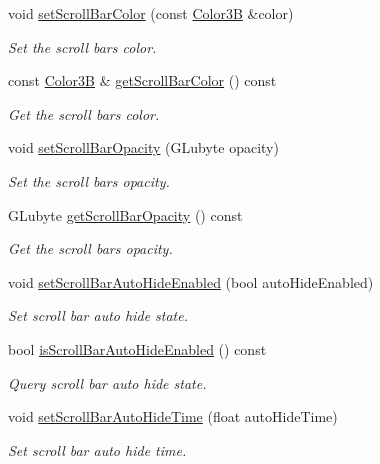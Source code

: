 \begin{DoxyCompactItemize}
void \hyperlink{classui_1_1ScrollView_a91d773f31ffb7c35c6a860bc6ceea697}{set\+Scroll\+Bar\+Color} (const \hyperlink{structColor3B}{Color3B} \&color)
\begin{DoxyCompactList}\small\item\em Set the scroll bar\textquotesingle{}s color. \end{DoxyCompactList}\item 
const \hyperlink{structColor3B}{Color3B} \& \hyperlink{classui_1_1ScrollView_a8e4bfc4bac7d2d30c3ca34431bcdfe94}{get\+Scroll\+Bar\+Color} () const
\begin{DoxyCompactList}\small\item\em Get the scroll bar\textquotesingle{}s color. \end{DoxyCompactList}\item 
void \hyperlink{classui_1_1ScrollView_ac5d6dca70e4843a9c22d896a2881aa76}{set\+Scroll\+Bar\+Opacity} (G\+Lubyte opacity)
\begin{DoxyCompactList}\small\item\em Set the scroll bar\textquotesingle{}s opacity. \end{DoxyCompactList}\item 
G\+Lubyte \hyperlink{classui_1_1ScrollView_acdf247a3ad48323ff02090a0459c8413}{get\+Scroll\+Bar\+Opacity} () const
\begin{DoxyCompactList}\small\item\em Get the scroll bar\textquotesingle{}s opacity. \end{DoxyCompactList}\item 
void \hyperlink{classui_1_1ScrollView_ad6b0c4ac3193fe18e80c3afeddf6dd9b}{set\+Scroll\+Bar\+Auto\+Hide\+Enabled} (bool auto\+Hide\+Enabled)
\begin{DoxyCompactList}\small\item\em Set scroll bar auto hide state. \end{DoxyCompactList}\item 
bool \hyperlink{classui_1_1ScrollView_a831fcfa013f9adf78215d5ee1e2077ae}{is\+Scroll\+Bar\+Auto\+Hide\+Enabled} () const
\begin{DoxyCompactList}\small\item\em Query scroll bar auto hide state. \end{DoxyCompactList}\item 
void \hyperlink{classui_1_1ScrollView_a18f6c3c2f4145c4119db33988a7d474c}{set\+Scroll\+Bar\+Auto\+Hide\+Time} (float auto\+Hide\+Time)
\begin{DoxyCompactList}\small\item\em Set scroll bar auto hide time. \end{DoxyCompactList}\item 

\end{DoxyCompactItemize}
